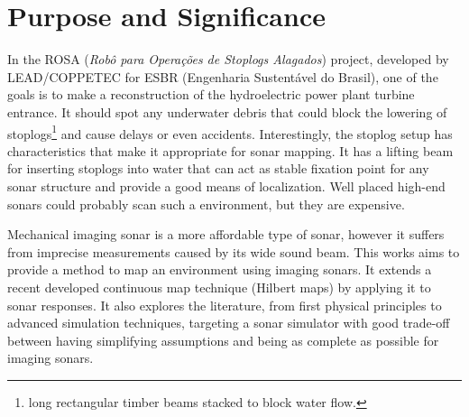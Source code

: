 \section{Purpose and Significance}



In the ROSA (\textit{Robô para Operações de Stoplogs Alagados}) project,
developed by LEAD/COPPETEC for ESBR (Engenharia Sustentável do Brasil), one of
the goals is to make a reconstruction of the hydroelectric power plant turbine
entrance. It should spot any underwater debris that could block the lowering of
stoplogs\footnote{long rectangular timber beams stacked to block water
flow.} and cause delays or even accidents.
Interestingly, the stoplog setup has characteristics that make it appropriate
for sonar mapping. It has a lifting beam for inserting stoplogs into
water that can act as stable fixation point for any sonar structure and
provide a good means of localization. Well placed high-end sonars could probably
scan such a environment, but they are expensive.

Mechanical imaging sonar is a more affordable type of sonar, however it suffers
from imprecise measurements caused by its wide sound beam. This works aims to
provide a method to map an environment using imaging sonars. It extends a
recent developed continuous map technique (Hilbert maps) by applying it to sonar
responses. It also explores the literature, from first physical principles to
advanced simulation techniques, targeting a sonar simulator with good trade-off
between having simplifying assumptions and being as complete as
possible for imaging sonars.

% 
% 
